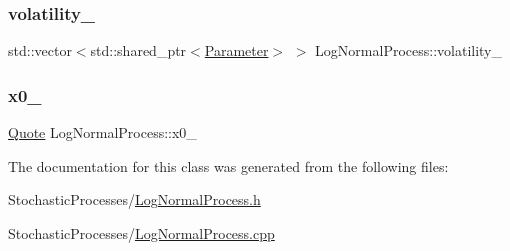 \hypertarget{class_log_normal_process_ac51be6698f524d4cc5da8ccbdd4e1256}{}\label{class_log_normal_process_ac51be6698f524d4cc5da8ccbdd4e1256} 
\subsubsection{\texorpdfstring{volatility\+\_\+}{volatility\_}}
{\footnotesize\ttfamily std\+::vector$<$std\+::shared\+\_\+ptr$<$\hyperlink{class_parameter}{Parameter}$>$ $>$ Log\+Normal\+Process\+::volatility\+\_\+\hspace{0.3cm}{\ttfamily [private]}}

\hypertarget{class_log_normal_process_a209592d8c0657d00ecbb3072567903e1}{}\label{class_log_normal_process_a209592d8c0657d00ecbb3072567903e1} 
\subsubsection{\texorpdfstring{x0\+\_\+}{x0\_}}
{\footnotesize\ttfamily \hyperlink{_name_def_8h_a642a6c5fd87319d922637de0e0bb0305}{Quote} Log\+Normal\+Process\+::x0\+\_\+\hspace{0.3cm}{\ttfamily [private]}}



The documentation for this class was generated from the following files\+:\begin{DoxyCompactItemize}
\item 
Stochastic\+Processes/\hyperlink{_log_normal_process_8h}{Log\+Normal\+Process.\+h}\item 
Stochastic\+Processes/\hyperlink{_log_normal_process_8cpp}{Log\+Normal\+Process.\+cpp}\end{DoxyCompactItemize}
